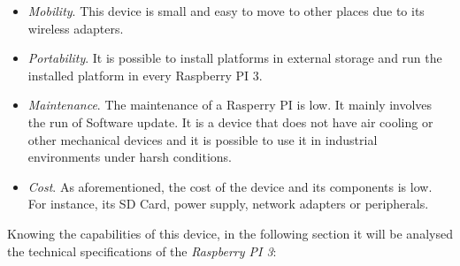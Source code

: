 \begin{itemize}

\item \textit{Mobility}. This device is small and easy to move to other places due to its wireless adapters.

\item \textit{Portability}. It is possible to install platforms in external storage and run the installed platform in every Raspberry PI 3.

\item \textit{Maintenance}. The maintenance of a Rasperry PI is low. It mainly involves the run of Software update. It is a device that does not have air cooling or other mechanical devices and it is possible to use it in industrial environments under harsh conditions.

\item \textit{Cost}. As aforementioned, the cost of the device and its components is low. For instance, its SD Card, power supply, network adapters or peripherals.

\end{itemize}

Knowing the capabilities of this device, in the following section it will be analysed the technical specifications of the \textit{Raspberry PI 3}:

